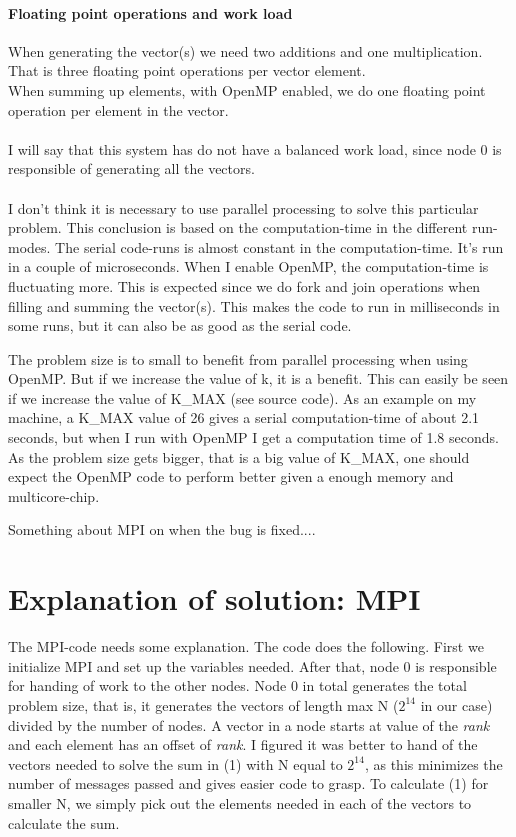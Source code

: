 \documentclass{article}
\begin{document}


\paragraph*{Floating point operations and work load}
When generating the vector(s) we need two additions and one multiplication. That is three floating point operations per vector element.\\
When summing up elements, with OpenMP enabled, we do one floating point operation per element in the vector. \\ \\

I will say that this system has do not have a balanced work load, since node 0 is responsible of generating all the vectors. \\ \\



I don't think it is necessary to use parallel processing to solve this particular problem. This conclusion is based on the computation-time in the different run-modes. The serial code-runs is almost constant in the computation-time. It's run in a couple of microseconds. When I enable OpenMP, the computation-time is fluctuating more. This is expected since we do fork and join operations when filling and summing the vector(s). This makes the code to run in milliseconds in some runs, but it can also be as good as the serial code. 

The problem size is to small to benefit from parallel processing when using OpenMP. But if we increase the value of k, it is a benefit. This can easily be seen if we increase the value of K\_MAX (see source code). As an example on my machine, a K\_MAX value of 26 gives a serial computation-time of about 2.1 seconds, but when I run with OpenMP I get a computation time of 1.8 seconds. As the problem size gets bigger, that is a big value of K\_MAX, one should expect the OpenMP code to perform better given a enough memory and multicore-chip. 

Something about MPI on when the bug is fixed.... 

\section*{Explanation of solution: MPI}
The MPI-code needs some explanation. The code does the following. First we initialize MPI and set up the variables needed. After that, node 0 is responsible for handing of work to the other nodes. Node 0 in total generates the total problem size, that is, it generates the vectors of length max N ($2^{14}$ in our case) divided by the number of nodes. A vector in a node starts at value of the \emph{rank} and each element has an offset of \emph{rank}. I figured it was better to hand of the vectors needed to solve the sum in (1) with N equal to $2^{14}$, as this minimizes the number of messages passed and gives easier code to grasp. To calculate (1) for smaller N, we simply pick out the elements needed in each of the vectors to calculate the sum.
\end{document}
